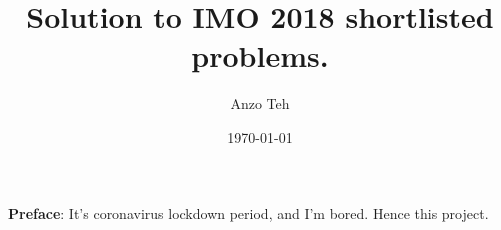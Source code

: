 \documentclass[11pt,a4paper]{article}
\begin{document}
\newcommand{\la}{\leftarrow}
\newcommand{\lra}{\leftrightarrow}
\newcommand{\bbN}{{\mathbb N}}
\newcommand{\bbZ}{{\mathbb Z}}
\newcommand{\bbQ}{{\mathbb Q}}
\newcommand{\bbR}{{\mathbb R}}
\newcommand{\bbC}{{\mathbb C}}
\newcommand{\bbH}{{\mathbb H}}
\newcommand{\dfeq}{\stackrel{\mathrm{def}}{=}}
\newcommand{\ra}{\rightarrow}
\newcommand{\Span}{\mathrm{span}}
\newcommand{\scrP}{\mathscr{P}}
\newcommand{\rank}{\mathrm{rank}}
\newcommand{\nullity}{\mathrm{nullity}}
\newcommand{\Col}{\mathrm{Col}}
\newcommand{\Row}{\mathrm{Row}}
\newcommand{\tr}{\mathrm{tr}}
\newcommand{\ol}{\overline}
\newcommand{\norm}[1]{||#1||}
\newcommand{\doubleline}[1]{\underline{\underline{#1}}}
\newcommand{\elemop}[1]{\stackrel{#1}{\longrightarrow}}
\newcommand{\Ind}{\mathrm{Ind}}
\newcommand{\Res}{\mathrm{Res}}
\newcommand{\End}{\mathrm{End}}
\newcommand{\cl}{\mathrm{cl}}
\newcommand{\code}[1]{\texttt{#1}}
\newcommand\tab[1][0.5cm]{\hspace*{#1}}
\newcommand{\<}{\langle}
\renewcommand{\>}{\rangle}
\newcommand{\qubits}[1]{|{#1}\rangle}
\newcommand{\powset}{\mathcal{P}}
\newcommand{\dsum}{\displaystyle\sum}


\title{Solution to IMO 2018 shortlisted problems.}
\author{Anzo Teh}
\date{\today}
\maketitle

\textbf{Preface}: It's coronavirus lockdown period, and I'm bored. Hence this project. 

\newpage
\end{document}
